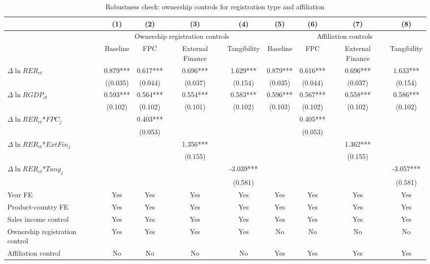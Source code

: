 \begin{table}
	\centering
	\caption{Robustness check: ownership controls for registration type and affiliation}
	\begin{threeparttable}
		\begin{tabular}{lcccccccc}
			\toprule
			& (1)   & (2)   & (3)   & (4) &  (5)  &  (6)  & (7)  & (8)\\
			\midrule
			& \multicolumn{4}{c}{Ownership registration controls} & \multicolumn{4}{c}{Affiliation controls}\\
			& Baseline & FPC   & External Finance & Tangibility & Baseline & FPC & External Finance & Tangibility\\
			\midrule
			$\Delta \ln RER_{ct}$ & 0.879*** & 0.617*** & 0.696*** & 1.629*** & 0.879*** & 0.616*** & 0.696*** & 1.633*** \\
			& ((0.035) & (0.044) & (0.037) & (0.154) & (0.035) & (0.044) & (0.037) & (0.154) \\
			$\Delta \ln RGDP_{ct}$ & 0.593*** & 0.564*** & 0.554*** & 0.583*** & 0.596*** & 0.567*** & 0.558*** & 0.586*** \\
			& (0.102) & (0.102) & (0.101) & (0.102) & (0.103) & (0.102) & (0.102) & (0.102) \\
			$\Delta \ln RER_{ct}$*$FPC_{j}$ &    & 0.403*** &       &       &       & 0.405*** &       &  \\
			&  & (0.053) &       &       &       & (0.053) &       &  \\
			$\Delta \ln RER_{ct}$*$ExtFin_{j}$ &    &       & 1.356*** &       &       &       & 1.362*** &  \\
			&   &       & (0.155) &       &       &       & (0.155) &  \\
			$\Delta \ln RER_{ct}$*$Tang_{j}$ &     &       &       & -3.039*** &       &       &       & -3.057*** \\
			&   &       &       & (0.581) &       &       &       & (0.581) \\
			Year FE  &  Yes   & Yes   & Yes   & Yes & Yes   & Yes   & Yes   & Yes\\
			Product-country FE &  Yes   & Yes   & Yes   & Yes & Yes   & Yes   & Yes   & Yes\\
			Sales income control &  Yes   & Yes   & Yes   & Yes & Yes   & Yes   & Yes   & Yes\\
			Ownership registration control &  Yes   & Yes & Yes  & Yes & No & No & No & No\\
			Affiliation control & No & No & No & No &  Yes  & Yes & Yes  & Yes \\

\end{tabular}
\end{threeparttable}
\end{table}
